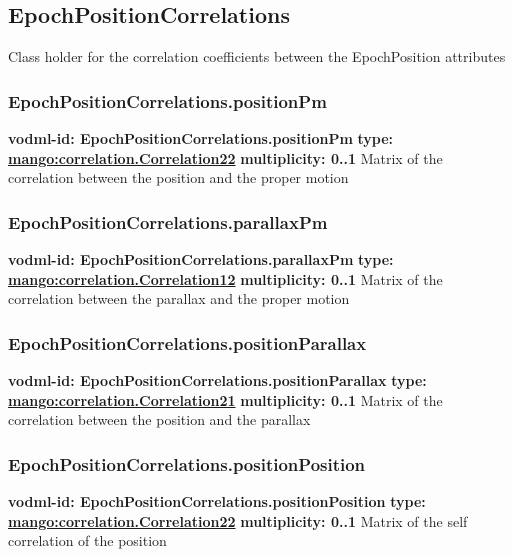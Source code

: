   \subsection{EpochPositionCorrelations}
  \label{sect:EpochPositionCorrelations}
    Class holder for the correlation coefficients between the EpochPosition attributes

    \subsubsection{EpochPositionCorrelations.positionPm}
      \textbf{vodml-id: EpochPositionCorrelations.positionPm} \newline
      \textbf{type: \hyperref[sect:correlation.Correlation22]{mango:correlation.Correlation22}} \newline
      \textbf{multiplicity: 0..1} \newline 
      Matrix of the correlation between the position and the proper motion

    \subsubsection{EpochPositionCorrelations.parallaxPm}
      \textbf{vodml-id: EpochPositionCorrelations.parallaxPm} \newline
      \textbf{type: \hyperref[sect:correlation.Correlation12]{mango:correlation.Correlation12}} \newline
      \textbf{multiplicity: 0..1} \newline 
      Matrix of the correlation between the parallax and the proper motion

    \subsubsection{EpochPositionCorrelations.positionParallax}
      \textbf{vodml-id: EpochPositionCorrelations.positionParallax} \newline
      \textbf{type: \hyperref[sect:correlation.Correlation21]{mango:correlation.Correlation21}} \newline
      \textbf{multiplicity: 0..1} \newline 
      Matrix of the correlation between the position and the parallax

    \subsubsection{EpochPositionCorrelations.positionPosition}
      \textbf{vodml-id: EpochPositionCorrelations.positionPosition} \newline
      \textbf{type: \hyperref[sect:correlation.Correlation22]{mango:correlation.Correlation22}} \newline
      \textbf{multiplicity: 0..1} \newline 
      Matrix of the self correlation of the position

